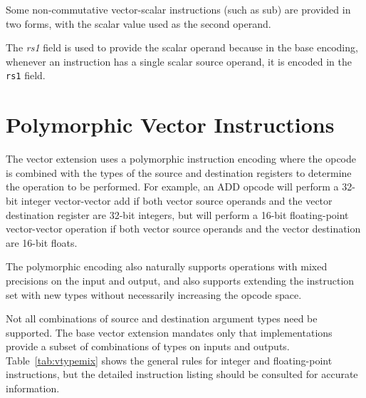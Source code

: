 Some non-commutative vector-scalar instructions (such as sub) are
provided in two forms, with the scalar value used as the second
operand.

\begin{commentary}
  The {\em rs1} field is used to provide the scalar operand because in
  the base encoding, whenever an instruction has a single scalar
  source operand, it is encoded in the {\tt rs1} field.
\end{commentary}

\section{Polymorphic Vector Instructions}

The vector extension uses a polymorphic instruction encoding where the
opcode is combined with the types of the source and destination
registers to determine the operation to be performed.  For example, an
ADD opcode will perform a 32-bit integer vector-vector add if both
vector source operands and the vector destination register are 32-bit
integers, but will perform a 16-bit floating-point vector-vector
operation if both vector source operands and the vector destination
are 16-bit floats.

The polymorphic encoding also naturally supports operations with mixed
precisions on the input and output, and also supports extending the
instruction set with new types without necessarily increasing the
opcode space.

Not all combinations of source and destination argument types need be
supported.  The base vector extension mandates only that
implementations provide a subset of combinations of types on inputs
and outputs.  Table~\ref{tab:vtypemix} shows the general rules for
integer and floating-point instructions, but the detailed instruction
listing should be consulted for accurate information.

